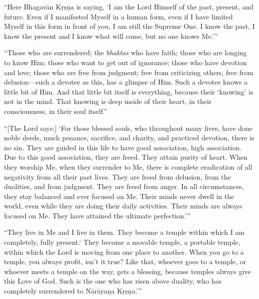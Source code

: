 \enquote{Here Bhagavān Kṛṣṇa is saying, \enquote{I am the Lord Himself of the past, present, and future. Even if I manifested Myself in a human form, even if I have limited Myself in this form in front of you, I am still the Supreme One. I know the past, I know the present and I know what will come, but no one knows Me.}}

\enquote{Those who are surrendered; the \textit{bhaktas} who have faith; those who are longing to know Him; those who want to get out of ignorance; those who have devotion and love; those who are free from judgment; free from criticizing others, free from delusion---such a devotee as this, has a glimpse of Him. Such a devotee knows a little bit of Him. And that little bit itself is everything, because their \enquote{knowing} is not in the mind. That knowing is deep inside of their heart, in their consciousness, in their soul itself.}

\enquote{[The Lord says:] \enquote{For those blessed souls, who throughout many lives, have done noble deeds, much penance, sacrifice, and charity, and practiced devotion, there is no sin. They are guided in this life to have good association, high association. Due to this good association, they are freed. They attain purity of heart. When they worship Me, when they surrender to Me, there is complete eradication of all negativity from all their past lives. They are freed from delusion, from the dualities, and from judgment. They are freed from anger. In all circumstances, they stay balanced and ever focused on Me. Their minds never dwell in the world, even while they are doing their daily activities. Their minds are always focused on Me. They have attained the ultimate perfection.}}

\enquote{They live in Me and I live in them. They become a temple within which I am completely, fully present.\enquote{ They become a movable temple, a portable temple, within which the Lord is moving from one place to another. When you go to a temple, you always profit, isn’t it true? Like that, whoever goes to a temple, or whoever meets a temple on the way, gets a blessing, because temples always give this Love of God. Such is the one who has risen above duality, who has completely surrendered to Nārāyaṇa Kṛṣṇa.}}
